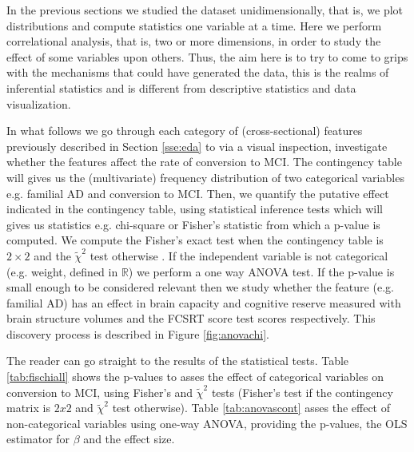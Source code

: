 \documentclass[11pt]{article}
\theoremstyle{definition}
\theoremstyle{remark}
\begin{document}
In the previous sections we studied the dataset unidimensionally, that is, we plot distributions and compute statistics one variable at a time. Here we perform correlational analysis, that is, two or more dimensions, in order to study the effect of some variables upon others. Thus, the aim here is to try to come to grips with the mechanisms that could have generated the data, this is the realms of inferential statistics and is different from descriptive statistics and data visualization. 

In what follows we go through each category of (cross-sectional) features previously described in Section \ref{sse:eda} to via a visual inspection, investigate whether the features affect the rate of conversion to MCI. The contingency table \cite{everitt1992analysis} will gives us the (multivariate) frequency distribution of two categorical variables e.g. familial AD and conversion to MCI. Then, we quantify the putative effect indicated in the contingency table, using statistical inference tests which will gives us statistics e.g. chi-square or Fisher's statistic from which a p-value is computed. 
We compute the Fisher's exact test when the contingency table is $2 \times 2$ and the $\tilde{\chi}^2$ test otherwise \cite{scipy2010}. If the independent variable is not categorical (e.g. weight, defined in $\mathbb{R}$) we perform a one way ANOVA test.
If the p-value is small enough to be considered relevant then we study whether the feature (e.g. familial AD) has an effect in brain capacity and cognitive reserve measured with brain structure volumes and the FCSRT score test scores respectively.
This discovery process is described in Figure \ref{fig:anovachi}. 

The reader can go straight to the results of the statistical tests. Table \ref{tab:fischiall} shows the p-values to asses the effect of categorical variables on conversion to MCI, using Fisher's and $\tilde{\chi}^2$ tests (Fisher's test if the contingency matrix is $2x2$  and $\tilde{\chi}^2$ test otherwise). Table \ref{tab:anovascont} asses the effect of non-categorical variables using one-way ANOVA, providing the p-values, the OLS estimator for $\beta$ and the effect size.


\end{document}

